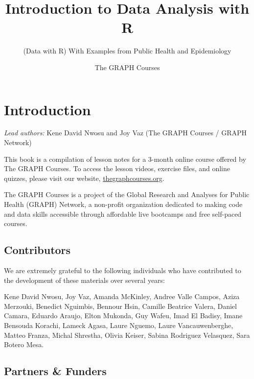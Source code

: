 \documentclass[
  letterpaper,
  DIV=11,
  numbers=noendperiod]{scrreprt}
\title{Introduction to Data Analysis with R}
\subtitle{(Data with R) With Examples from Public Health and
Epidemiology}
\author{The GRAPH Courses}
\date{}
\renewcommand*\contentsname{Table of contents}
\newcommand\contentsname{Table of contents}
\begin{document}
\maketitle

\pagestyle{mystyle}

\renewcommand*\contentsname{Table of contents}
{
\hypersetup{linkcolor=}
\setcounter{tocdepth}{2}
\tableofcontents
}


\chapter*{Introduction}\label{introduction}


\emph{Lead authors:} Kene David Nwosu and Joy Vaz (The GRAPH Courses /
GRAPH Network)

This book is a compilation of lesson notes for a 3-month online course
offered by The GRAPH Courses. To access the lesson videos, exercise
files, and online quizzes, please visit our website,
\href{https://thegraphcourses.org}{thegraphcourses.org}.

The GRAPH Courses is a project of the Global Research and Analyses for
Public Health (GRAPH) Network, a non-profit organization dedicated to
making code and data skills accessible through affordable live bootcamps
and free self-paced courses.

\section*{Contributors}\label{contributors}


We are extremely grateful to the following individuals who have
contributed to the development of these materials over several years:

Kene David Nwosu, Joy Vaz, Amanda McKinley, Andree Valle Campos, Aziza
Merzouki, Benedict Nguimbis, Bennour Hsin, Camille Beatrice Valera,
Daniel Camara, Eduardo Araujo, Elton Mukonda, Guy Wafeu, Imad El Badisy,
Imane Bensouda Korachi, Lameck Agasa, Laure Nguemo, Laure
Vancauwenberghe, Matteo Franza, Michal Shrestha, Olivia Keiser, Sabina
Rodriguez Velasquez, Sara Botero Mesa.

\section*{Partners \& Funders}\label{partners-funders}
\end{document}

